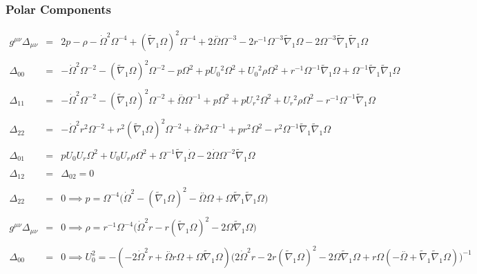 \documentclass[10pt,letterpaper]{article}
\numberwithin{equation}{section}
\begin{document}
\subsubsection{Polar Components}
\begin{eqnarray}
g^{\mu\nu}\Delta_{\mu\nu}&=& 2 p -  \rho -  \dot{\Omega}^2 \Omega^{-4} + (\tilde{\nabla}_{1}\Omega)^2 \Omega^{-4} + 2 \overset{..}{\Omega} \Omega^{-3} - 2 r^{-1} \Omega^{-3} \tilde{\nabla}_{1}\Omega - 2 \Omega^{-3} \tilde{\nabla}_{1}\tilde{\nabla}_{1}\Omega 
\\ \nonumber\\
\Delta_{00}&=& - \dot{\Omega}^2 \Omega^{-2} -  (\tilde{\nabla}_{1}\Omega)^2 \Omega^{-2} -  p \Omega^2 + p U_{0}{}^2 \Omega^2 + U_{0}{}^2 \rho \Omega^2 + r^{-1} \Omega^{-1} \tilde{\nabla}_{1}\Omega + \Omega^{-1} \tilde{\nabla}_{1}\tilde{\nabla}_{1}\Omega 
\\  \nonumber\\ 
\Delta_{11}&=& - \dot{\Omega}^2 \Omega^{-2} -  (\tilde{\nabla}_{1}\Omega)^2 \Omega^{-2} + \overset{..}{\Omega} \Omega^{-1} + p \Omega^2 + p U_{r}{}^2 \Omega^2 + U_{r}{}^2 \rho \Omega^2 -  r^{-1} \Omega^{-1} \tilde{\nabla}_{1}\Omega 
\\  \nonumber\\ 
\Delta_{22}&=& - \dot{\Omega}^2 r^2 \Omega^{-2} + r^2 (\tilde{\nabla}_{1}\Omega)^2 \Omega^{-2} + \overset{..}{\Omega} r^2 \Omega^{-1} + p r^2 \Omega^2 -  r^2 \Omega^{-1} \tilde{\nabla}_{1}\tilde{\nabla}_{1}\Omega 
\\  \nonumber\\ 
\Delta_{01}&=& p U_{0}{} U_{r}{} \Omega^2 + U_{0}{} U_{r}{} \rho \Omega^2 + \Omega^{-1} \tilde{\nabla}_{1}\dot{\Omega} - 2 \dot{\Omega} \Omega^{-2} \tilde{\nabla}_{1}\Omega 
\\ \nonumber\\
\Delta_{12}&=& \Delta_{02}= 0
\\ \nonumber\\
\Delta_{22} &=& 0\implies \boxed{ p =\Omega^{-4} \bigl(\dot{\Omega}^2 -  (\tilde{\nabla}_{1}\Omega)^2 -  \overset{..}{\Omega} \Omega + \Omega \tilde{\nabla}_{1}\tilde{\nabla}_{1}\Omega \bigr)} 
\\ \nonumber\\
g^{\mu\nu}\Delta_{\mu\nu} &=& 0\implies \boxed{ \rho =r^{-1} \Omega^{-4} \bigl(\dot{\Omega}^2 r -  r (\tilde{\nabla}_{1}\Omega)^2 - 2 \Omega \tilde{\nabla}_{1}\Omega \bigr)}
\\ \nonumber\\
\Delta_{00} &=& 0 \implies \boxed{U_0^2 = - (-2 \dot{\Omega}^2 r + \overset{..}{\Omega} r \Omega + \Omega \tilde{\nabla}_{1}\Omega) \bigl(2 \dot{\Omega}^2 r - 2 r (\tilde{\nabla}_{1}\Omega)^2 - 2 \Omega \tilde{\nabla}_{1}\Omega + r \Omega (- \overset{..}{\Omega} + \tilde{\nabla}_{1}\tilde{\nabla}_{1}\Omega)\bigr)^{-1}}

\end{eqnarray}
\end{document}
